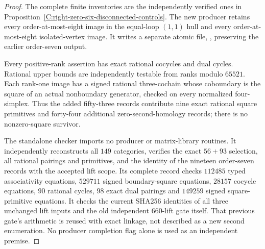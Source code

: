 \begin{proof}
The complete finite inventories are the independently verified ones
in Proposition~\ref{C:right-zero-six-disconnected-controls}.
The new producer
retains every order-at-most-eight image in the equal-loop $(1,1)$
hull and every order-at-most-eight isolated-vertex image.
It writes a separate atomic file,
,
preserving the earlier order-seven output.

Every positive-rank assertion has exact rational cocycles and
dual cycles.  Rational upper bounds are independently testable
from ranks modulo $65521$.  Each rank-one image has a signed
rational three-cochain whose coboundary is the square of an
actual nonboundary generator, checked on every normalized
four-simplex.  Thus the added fifty-three records contribute
nine exact rational square primitives and forty-four additional
zero-second-homology records; there is no nonzero-square survivor.

The standalone checker
imports no producer or matrix-library routines.  It independently
reconstructs all $149$ categories, verifies the exact $56+93$
selection, all rational pairings and primitives, and the identity
of the nineteen order-seven records with the accepted lift scope.
Its complete record
checks $112485$ typed associativity equations, $529711$ signed
boundary-square equations, $28157$ cocycle equations, $90$
rational cycles, $98$ exact dual pairings and $149259$ signed
square-primitive equations.  It checks the current SHA256
identities of all three unchanged lift inputs and the old
independent $660$-lift gate itself.  That previous gate's
arithmetic is reused with exact linkage, not described as a
new second enumeration.  No producer completion flag alone
is used as an independent premise.
\end{proof}

